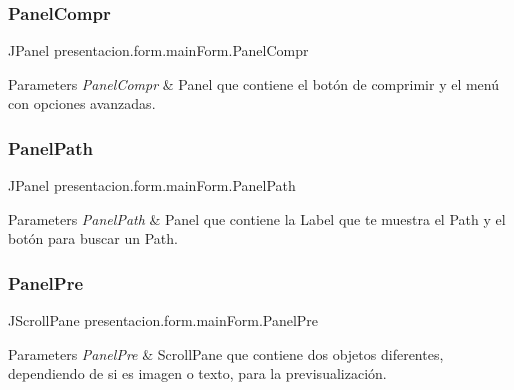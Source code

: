 \subsubsection{\texorpdfstring{Panel\+Compr}{PanelCompr}}
{\footnotesize\ttfamily J\+Panel presentacion.\+form.\+main\+Form.\+Panel\+Compr\hspace{0.3cm}{\ttfamily [private]}}


\begin{DoxyParams}{Parameters}
{\em Panel\+Compr} & Panel que contiene el botón de comprimir y el menú con opciones avanzadas. \\
\hline
\end{DoxyParams}
\mbox{\label{classpresentacion_1_1form_1_1mainForm_a0704eebe3c2e55cfd3b9344cca4d2d4b}} 
\subsubsection{\texorpdfstring{Panel\+Path}{PanelPath}}
{\footnotesize\ttfamily J\+Panel presentacion.\+form.\+main\+Form.\+Panel\+Path\hspace{0.3cm}{\ttfamily [private]}}


\begin{DoxyParams}{Parameters}
{\em Panel\+Path} & Panel que contiene la Label que te muestra el Path y el botón para buscar un Path. \\
\hline
\end{DoxyParams}
\mbox{\label{classpresentacion_1_1form_1_1mainForm_aed4360d9cf00129ea2fd69fd26fccca7}} 
\subsubsection{\texorpdfstring{Panel\+Pre}{PanelPre}}
{\footnotesize\ttfamily J\+Scroll\+Pane presentacion.\+form.\+main\+Form.\+Panel\+Pre\hspace{0.3cm}{\ttfamily [private]}}


\begin{DoxyParams}{Parameters}
{\em Panel\+Pre} & Scroll\+Pane que contiene dos objetos diferentes, dependiendo de si es imagen o texto, para la previsualización. \\
\hline
\end{DoxyParams}
\mbox{\label{classpresentacion_1_1form_1_1mainForm_ae04f75ed65fa9e0347f645e877f6eb95}} 
